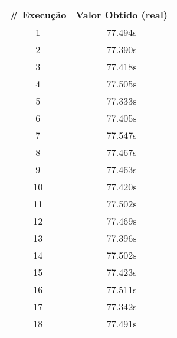 \documentclass[11pt]{article}
\begin{document}
\begin{table}[!h]
\begin{center}
\begin{minipage}{0.48\textwidth}
\begin{tabular}{| c | c |}
			\hline
				\textbf{\# Execução} &  \textbf{Valor Obtido (real)} \\ \hline
				1 & 77.494s \\ \hline
				2 & 77.390s \\ \hline
				3 & 77.418s \\ \hline
				4 & 77.505s \\ \hline
				5 & 77.333s \\ \hline
				6 & 77.405s \\ \hline
				7 & 77.547s \\ \hline
				8 & 77.467s \\ \hline
				9 & 77.463s \\ \hline
				10 & 77.420s \\ \hline
				11 & 77.502s \\ \hline
				12 & 77.469s \\ \hline
				13 & 77.396s \\ \hline
				14 & 77.502s \\ \hline
				15 & 77.423s \\ \hline
				16 & 77.511s \\ \hline
				17 & 77.342s \\ \hline
				18 & 77.491s \\ \hline
			\end{tabular}
		\end{minipage}
	\end{center}
\end{table}

\pagebreak
\end{document}
